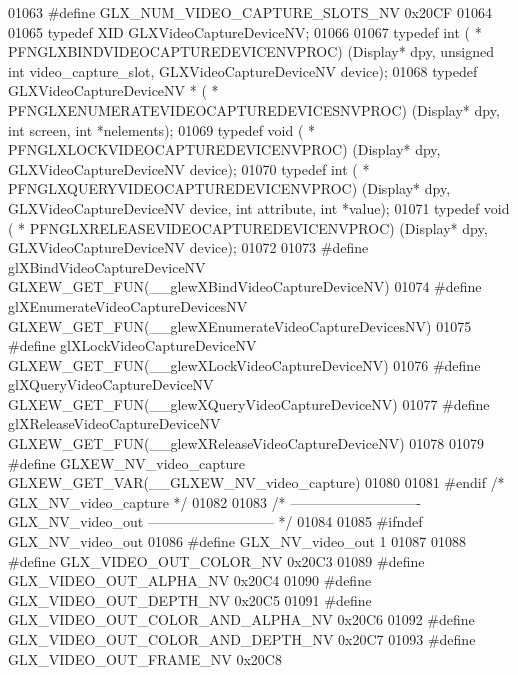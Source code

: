 \begin{DoxyCode}
01063 \textcolor{preprocessor}{#define GLX\_NUM\_VIDEO\_CAPTURE\_SLOTS\_NV 0x20CF}
01064 
01065 \textcolor{keyword}{typedef} XID GLXVideoCaptureDeviceNV;
01066 
01067 \textcolor{keyword}{typedef} int ( * PFNGLXBINDVIDEOCAPTUREDEVICENVPROC) (Display* dpy, \textcolor{keywordtype}{unsigned} \textcolor{keywordtype}{int} video\_capture\_slot, 
      GLXVideoCaptureDeviceNV device);
01068 \textcolor{keyword}{typedef} GLXVideoCaptureDeviceNV * ( * PFNGLXENUMERATEVIDEOCAPTUREDEVICESNVPROC) (Display* dpy, \textcolor{keywordtype}{int} screen, \textcolor{keywordtype}{
      int} *nelements);
01069 \textcolor{keyword}{typedef} void ( * PFNGLXLOCKVIDEOCAPTUREDEVICENVPROC) (Display* dpy, GLXVideoCaptureDeviceNV 
      device);
01070 \textcolor{keyword}{typedef} int ( * PFNGLXQUERYVIDEOCAPTUREDEVICENVPROC) (Display* dpy, GLXVideoCaptureDeviceNV 
      device, \textcolor{keywordtype}{int} attribute, \textcolor{keywordtype}{int} *value);
01071 \textcolor{keyword}{typedef} void ( * PFNGLXRELEASEVIDEOCAPTUREDEVICENVPROC) (Display* dpy, GLXVideoCaptureDeviceNV 
      device);
01072 
01073 \textcolor{preprocessor}{#define glXBindVideoCaptureDeviceNV GLXEW\_GET\_FUN(\_\_glewXBindVideoCaptureDeviceNV)}
01074 \textcolor{preprocessor}{#define glXEnumerateVideoCaptureDevicesNV GLXEW\_GET\_FUN(\_\_glewXEnumerateVideoCaptureDevicesNV)}
01075 \textcolor{preprocessor}{#define glXLockVideoCaptureDeviceNV GLXEW\_GET\_FUN(\_\_glewXLockVideoCaptureDeviceNV)}
01076 \textcolor{preprocessor}{#define glXQueryVideoCaptureDeviceNV GLXEW\_GET\_FUN(\_\_glewXQueryVideoCaptureDeviceNV)}
01077 \textcolor{preprocessor}{#define glXReleaseVideoCaptureDeviceNV GLXEW\_GET\_FUN(\_\_glewXReleaseVideoCaptureDeviceNV)}
01078 
01079 \textcolor{preprocessor}{#define GLXEW\_NV\_video\_capture GLXEW\_GET\_VAR(\_\_GLXEW\_NV\_video\_capture)}
01080 
01081 \textcolor{preprocessor}{#endif }\textcolor{comment}{/* GLX\_NV\_video\_capture */}\textcolor{preprocessor}{}
01082 
01083 \textcolor{comment}{/* ---------------------------- GLX\_NV\_video\_out --------------------------- */}
01084 
01085 \textcolor{preprocessor}{#ifndef GLX\_NV\_video\_out}
01086 \textcolor{preprocessor}{#define GLX\_NV\_video\_out 1}
01087 
01088 \textcolor{preprocessor}{#define GLX\_VIDEO\_OUT\_COLOR\_NV 0x20C3}
01089 \textcolor{preprocessor}{#define GLX\_VIDEO\_OUT\_ALPHA\_NV 0x20C4}
01090 \textcolor{preprocessor}{#define GLX\_VIDEO\_OUT\_DEPTH\_NV 0x20C5}
01091 \textcolor{preprocessor}{#define GLX\_VIDEO\_OUT\_COLOR\_AND\_ALPHA\_NV 0x20C6}
01092 \textcolor{preprocessor}{#define GLX\_VIDEO\_OUT\_COLOR\_AND\_DEPTH\_NV 0x20C7}
01093 \textcolor{preprocessor}{#define GLX\_VIDEO\_OUT\_FRAME\_NV 0x20C8}

\end{DoxyCode}
